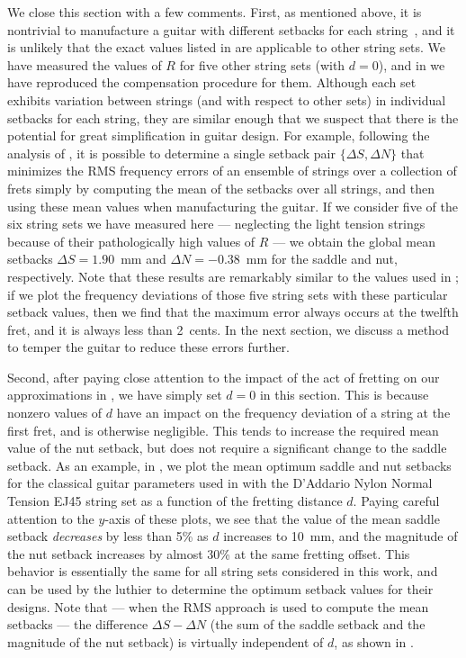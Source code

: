 We close this section with a few comments. First, as mentioned above, it is nontrivial to manufacture a guitar with different setbacks for each string~\cite{ref:byers1996cgi}, and it is unlikely that the exact values listed in  are applicable to other string sets. We have measured the values of $R$ for five other string sets (with $d = 0$), and in  we have reproduced the compensation procedure for them. Although each set exhibits variation between strings (and with respect to other sets) in individual setbacks for each string, they are similar enough that we suspect that there is the potential for great simplification in guitar design. For example, following the analysis of , it is possible to determine a single setback pair $\{\Delta S, \Delta N\}$ that minimizes the RMS frequency errors of an ensemble of strings over a collection of frets simply by computing the mean of the setbacks over all strings, and then using these mean values when manufacturing the guitar. If we consider five of the six string sets we have measured here --- neglecting the light tension strings because of their pathologically high values of $R$ --- we obtain the global mean setbacks $\Delta S = 1.90$~mm and $\Delta N = -0.38$~mm for the saddle and nut, respectively. Note that these results are remarkably similar to the values used in ; if we plot the frequency deviations of those five string sets with these particular setback values, then we find that the maximum error always occurs at the twelfth fret, and it is always less than 2~cents. In the next section, we discuss a method to temper the guitar to reduce these errors further.

Second, after paying close attention to the impact of the act of fretting on our approximations in , we have simply set $d = 0$ in this section. This is because nonzero values of $d$ have an impact on the frequency deviation of a string at the first fret, and is otherwise negligible. This tends to increase the required mean value of the nut setback, but does not require a significant change to the saddle setback. As an example, in , we plot the mean optimum saddle and nut setbacks for the classical guitar parameters used in  with the D'Addario Nylon Normal Tension EJ45 string set as a function of the fretting distance $d$. Paying careful attention to the $y$-axis of these plots, we see that the value of the mean saddle setback \emph{decreases} by less than 5\% as $d$ increases to 10~mm, and the magnitude of the nut setback increases by almost 30\% at the same fretting offset. This behavior is essentially the same for all string sets considered in this work, and can be used by the luthier to determine the optimum setback values for their designs. Note that --- when the RMS approach is used to compute the mean setbacks --- the difference $\Delta S - \Delta N$ (the sum of the saddle setback and the magnitude of the nut setback) is virtually independent of $d$, as shown in .

